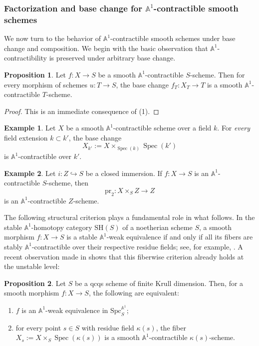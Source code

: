 \documentclass[10pt]{amsart}
\renewcommand{\AA}{\mathbb{A}}
\newcommand{\Spec}{\operatorname{Spec}}
\numberwithin{equation}{section} %
\theoremstyle{plain}
\theoremstyle{definition}
\newtheorem{prop}[prop]{Proposition}
\newtheorem{example}[example]{Example}
\theoremstyle{remark}
\begin{document}
\subsubsection{Factorization and base change for $\AA^1$-contractible smooth schemes}

We now turn to the behavior of $\AA^1$-contractible smooth schemes under base change and composition.  
We begin with the basic observation that $\AA^1$-contractibility is preserved under arbitrary base change.

\begin{prop}\label{pullbackfunctor}
Let $f:X\rightarrow S$ be a smooth $\AA^1$-contractible $S$-scheme.  
Then for every morphism of schemes $u:T\rightarrow S$, the base change 
$f_T:X_T \rightarrow  T$
is a smooth $\AA^1$-contractible $T$-scheme.
\end{prop}

\begin{proof} 
This is an immediate consequence of (1). 
\end{proof}

\begin{example}\label{basechange:imperfect}
Let $X$ be a smooth $\AA^1$-contractible scheme over a field $k$.  
For \emph{every} field extension $k\subset k'$, the base change
\[
X_{k'}:=X\times_{\Spec(k)}\Spec(k')
\]
is $\AA^1$-contractible over $k'$.
\end{example}

\smallskip

\begin{example}\label{basechange:closedimm}
Let $i:Z\hookrightarrow S$ be a closed immersion.  
If $f:X\rightarrow S$ is an $\AA^1$-contractible $S$-scheme, then 
\[
\mathrm{pr}_2:X\times_S Z\rightarrow Z
\]
is an $\AA^1$-contractible $Z$-scheme.
\end{example}

The following structural criterion plays a fundamental role in what follows. In the stable $\AA^1$-homotopy category $\mathrm{SH}(S)$ of a noetherian scheme $S$, a smooth morphism $f:X \rightarrow S$ is a stable $\AA^1$-weak equivalence if and only if all its fibers are stably $\AA^1$-contractible over their respective residue fields; see, for example, \cite[Proposition B.3]{bachmann2021norms}.  
A recent observation made in \cite[Proposition~2.1]{ABEH-real-etale} shows that this fiberwise criterion already holds at the unstable level:

\begin{prop}\label{cor:A1-cont-fibers}
Let $S$ be a qcqs scheme of finite Krull dimension. Then, for a smooth morphism $f:X \rightarrow S$, the following are equivalent:
\begin{enumerate}
    \item $f$ is an $\AA^1$-weak equivalence in $\mathrm{Spc}_S^{\AA^1}$;
    \item for every point $s\in S$ with residue field $\kappa(s)$, the fiber $X_s:=X\times_S\Spec(\kappa(s))$ is a smooth $\AA^1$-contractible $\kappa(s)$-scheme.
\end{enumerate}
\end{prop}
\end{document}
